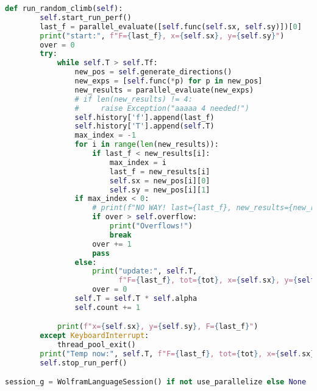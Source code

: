 \begin{lstlisting}[language=Python,breaklines=true]
    def run_random_climb(self):
        self.start_run_perf()
        last_f = parallel_evaluate([self.func(self.sx, self.sy)])[0]
        print("start:", f"F={last_f}, x={self.sx}, y={self.sy}")
        over = 0
        try:
            while self.T > self.Tf:
                new_pos = self.generate_directions()
                new_exps = [self.func(*p) for p in new_pos]
                new_results = parallel_evaluate(new_exps)
                # if len(new_results) != 4:
                #     raise Exception("aaaaa 4 needed!")
                self.history['f'].append(last_f)
                self.history['T'].append(self.T)
                max_index = -1
                for i in range(len(new_results)):
                    if last_f < new_results[i]:
                        max_index = i
                        last_f = new_results[i]
                        self.sx = new_pos[i][0]
                        self.sy = new_pos[i][1]
                if max_index < 0:
                    # print(f"NO WAY! last={last_f}, new_results={new_results}")
                    if over > self.overflow:
                        print("Overflows!")
                        break
                    over += 1
                    pass
                else:
                    print("update:", self.T,
                          f"F={last_f}, tot={tot}, x={self.sx}, y={self.sy}, count={self.count}")
                    over = 0
                self.T = self.T * self.alpha
                self.count += 1

            print(f"x={self.sx}, y={self.sy}, F={last_f}")
        except KeyboardInterrupt:
            thread_pool_exit()
        print("Temp now:", self.T, f"F={last_f}, tot={tot}, x={self.sx}, y={self.sy}, count={self.count}")
        self.stop_run_perf()

session_g = WolframLanguageSession() if not use_parallelize else None


\end{lstlisting}
